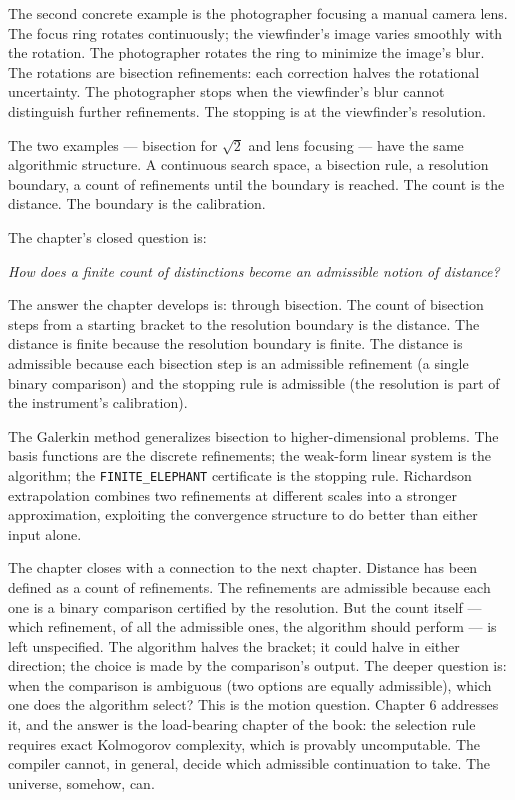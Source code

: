 \begin{chapteressay}
The second concrete example is the photographer focusing a manual
camera lens. The focus ring rotates continuously; the viewfinder's
image varies smoothly with the rotation. The photographer rotates the
ring to minimize the image's blur. The rotations are bisection
refinements: each correction halves the rotational uncertainty. The
photographer stops when the viewfinder's blur cannot distinguish
further refinements. The stopping is at the viewfinder's resolution.

The two examples --- bisection for $\sqrt{2}$ and lens focusing --- have
the same algorithmic structure. A continuous search space, a
bisection rule, a resolution boundary, a count of refinements until
the boundary is reached. The count is the distance. The boundary is
the calibration.

The chapter's closed question is:

\begin{center}
\emph{How does a finite count of distinctions become an admissible
notion of distance?}
\end{center}

The answer the chapter develops is: through bisection. The count of
bisection steps from a starting bracket to the resolution boundary is
the distance. The distance is finite because the resolution boundary
is finite. The distance is admissible because each bisection step is
an admissible refinement (a single binary comparison) and the stopping
rule is admissible (the resolution is part of the instrument's
calibration).

The Galerkin method generalizes bisection to higher-dimensional
problems. The basis functions are the discrete refinements; the
weak-form linear system is the algorithm; the
\texttt{FINITE\_ELEPHANT} certificate is the stopping rule.
Richardson extrapolation combines two refinements at different
scales into a stronger approximation, exploiting the convergence
structure to do better than either input alone.

The chapter closes with a connection to the next chapter. Distance
has been defined as a count of refinements. The refinements are
admissible because each one is a binary comparison certified by the
resolution. But the count itself --- which refinement, of all the
admissible ones, the algorithm should perform --- is left
unspecified. The algorithm halves the bracket; it could halve in
either direction; the choice is made by the comparison's output.
The deeper question is: when the comparison is ambiguous (two
options are equally admissible), which one does the algorithm
select? This is the motion question. Chapter 6 addresses it, and
the answer is the load-bearing chapter of the book: the selection
rule requires exact Kolmogorov complexity, which is provably
uncomputable. The compiler cannot, in general, decide which
admissible continuation to take. The universe, somehow, can.

\end{chapteressay}

